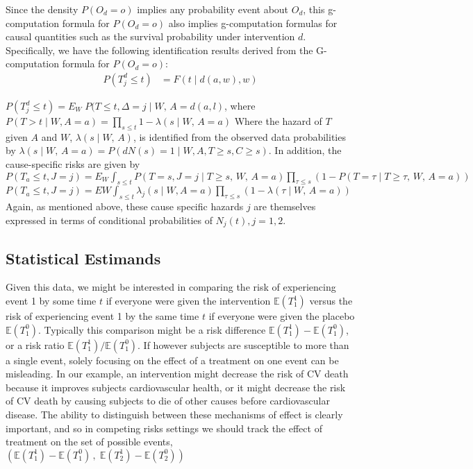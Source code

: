 \documentclass{report}
\newcommand{\1}{\ensuremath{\mathbf{1}}}
\renewcommand{\L}{\ensuremath{W}}
\renewcommand{\l}{\ensuremath{w}}
\begin{document}
Since the density \(P(O_d=o)\) implies any probability event about \(O_d\), this g-computation formula for \(P(O_d=o)\) also implies g-computation formulas for causal quantities such as the survival probability under intervention \(d\). Specifically, we have the following identification results derived from the G-computation formula for \(P(O_d=o)\):
\begin{align*}
P\left(T^d_{j} \leq t\right) &= F(t \mid d(a, \l), \l)
\end{align*}

\(P(T^d_{j} \leq t)=E_{\L} \; P(T \leq t, \Delta = j \mid \L,\, A=d(a, l)\), where \(P(T>t \mid W, A=a) = \prod_{s \leq t} 1 -\lambda(s \mid W,\, A=a)\)
Where the hazard of \(T\) given \(A\) and \(W\), \(\lambda(s \mid W,\, A)\), is identified from the observed data probabilities by \(\lambda(s \mid W,\, A=a) = P(dN(s)=1 \mid W, A, T \geq s, C \geq s)\). In addition, the cause-specific risks are given by 
\(P(T_{a} \leq t, J=j)=E_{W} \int_{s \leq t} P(T=s, J=j \mid T \geq s,\, W,\, A=a) \prod_{\tau \leq s} (1 - P(T= \tau \mid T \geq \tau,\, W,\, A=a))\) 
\(P(T_{a} \leq t, J=j) = E{W} \int_{s \leq t} \lambda_{j}(s \mid W, A=a) \prod_{\tau \leq s} (1-\lambda(\tau \mid W,\, A=a))\) 
Again, as mentioned above, these cause specific hazards \(j\) are themselves expressed in terms of conditional probabilities of \(N_{j}(t), j=1, 2\).

\subsection{Statistical Estimands}
\label{sec:org0ba3bba}

Given this data, we might be interested in comparing the risk of experiencing event 1 by some time \(t\) if everyone were given the intervention \(\mathbb{E}(T^1_1)\) versus the risk of experiencing event 1 by the same time \(t\) if everyone were given the placebo \(\mathbb{E}(T^0_1)\). Typically this comparison might be a risk difference \(\mathbb{E}(T^1_1) - \mathbb{E}(T^0_1)\), or a risk ratio \(\mathbb{E}(T^1_1) / \mathbb{E}(T^0_1)\).
If however subjects are susceptible to more than a single event, solely focusing on the effect of a treatment on one event can be misleading. In our example, an intervention might decrease the risk of CV death because it improves subjects cardiovascular health, or it might decrease the risk of CV death by causing subjects to die of other causes before cardiovascular disease. The ability to distinguish between these mechanisms of effect is clearly important, and so in competing risks settings we should track the effect of treatment on the set of possible events, \(\left(\mathbb{E}(T^1_1) - \mathbb{E}(T^0_1)\,,\;\mathbb{E}(T^1_2) - \mathbb{E}(T^0_2)\right)\)
\end{document}

